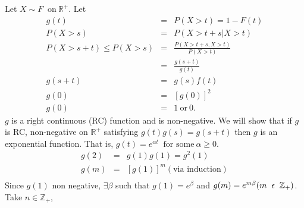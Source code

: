 \documentclass[a4paper,10pt]{article}
\theoremstyle{plain}
\theoremstyle{definition}
\begin{document}
 
Let $X\sim F~ \text{ on}~  \mathbb{R}^{+}$. Let \\
\begin{eqnarray*}
  g(t) &=& P(X>t) = 1-F (t) \\
  P(X>s) &=& P(X>t+s| X>t) \\
  P(X>s+t) \leq P(X>s) &=& \frac{P(X>t+s, X>t)}{P(X>t)} \\
   &=& \frac{g(s+t)}{g(t)} \\
  g(s+t) &=& g(s)f(t)\\
  g(0)&=& [g(0)]^{2}\\
  g(0)&=&1~ \text{or}~ 0. 
\end{eqnarray*}
$g$ is a right continuous (RC) function and is non-negative. We will show that if $g$ is RC, non-negative on $\mathbb{R}^{+}$ satisfying $ g(t) g(s)= g(s+t)$ then $g$ is an exponential function. That is, $g(t) = e^{\alpha t} ~\text{ for some}~  \alpha \geq 0$.
 \begin{eqnarray*}
            g(2) &=& g(1) g(1) =g^{2}(1) \\
            g(m) &=& [g(1)]^{m} (\text{via induction}) \\
               \end{eqnarray*}
               Since $g(1)$ non negative, $\exists  \beta$ such that $g(1)=e^{\beta}$ and $g(m)= e^{m \beta} (  m \hspace{0.2cm}\epsilon \hspace{0.2cm}\mathbb{Z}_{+})$. Take $n \in \mathbb{Z}_{+} $,\\
             
\end{document}
